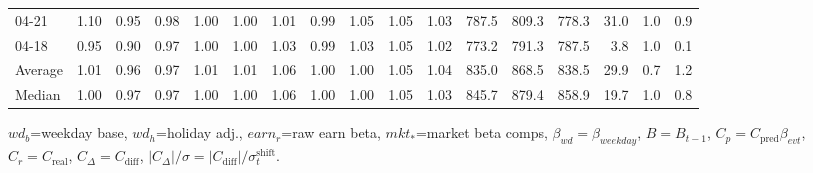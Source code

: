\begin{threeparttable}
{\begin{tabular}{lrrrrrrrrrrrrrrrr}
  04-21 &   1.10 &   0.95 &         0.98 &     1.00 &           1.00 &        1.01 &        0.99 &        1.05 &          1.05 &          1.03 & 787.5 & 809.3 & 778.3 &       31.0 &                      1.0 &                 0.9 \\
  04-18 &   0.95 &   0.90 &         0.97 &     1.00 &           1.00 &        1.03 &        0.99 &        1.03 &          1.05 &          1.02 & 773.2 & 791.3 & 787.5 &        3.8 &                      1.0 &                 0.1 \\
Average &   1.01 &   0.96 &         0.97 &     1.01 &           1.01 &        1.06 &        1.00 &        1.00 &          1.05 &          1.04 & 835.0 & 868.5 & 838.5 &       29.9 &                      0.7 &                 1.2 \\
 Median &   1.00 &   0.97 &         0.97 &     1.00 &           1.00 &        1.06 &        1.00 &        1.00 &          1.05 &          1.03 & 845.7 & 879.4 & 858.9 &       19.7 &                      1.0 &                 0.8 \\
\bottomrule
\end{tabular}
}
\begin{tablenotes}\footnotesize
\item $wd_b$=weekday base, $wd_h$=holiday adj.,
$earn_r$=raw earn beta, $mkt_{*}$=market beta comps,
$\beta_{wd}=\beta_{weekday}$, $B=B_{t-1}$,
$C_p=C_{\text{pred}}\beta_{evt}$, $C_r=C_{\text{real}}$,
$C_\Delta=C_{\text{diff}}$, $|C_\Delta|/\sigma=|C_{\text{diff}}|/\sigma_t^{\text{shift}}$.
\end{tablenotes}
\end{threeparttable}
\endgroup
